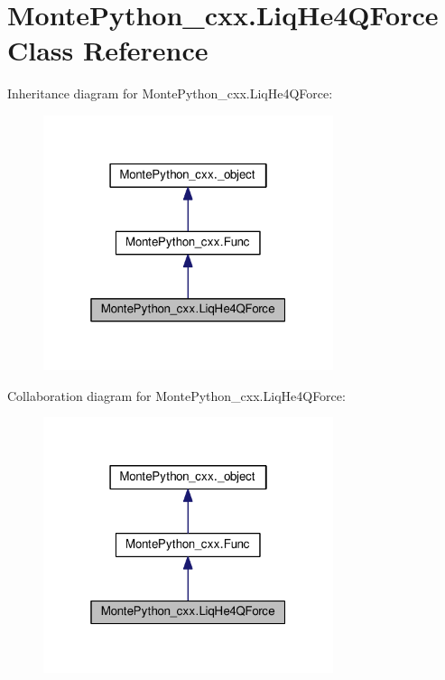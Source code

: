 \hypertarget{classMontePython__cxx_1_1LiqHe4QForce}{}\section{Monte\+Python\+\_\+cxx.\+Liq\+He4\+Q\+Force Class Reference}
\label{classMontePython__cxx_1_1LiqHe4QForce}


Inheritance diagram for Monte\+Python\+\_\+cxx.\+Liq\+He4\+Q\+Force\+:
\nopagebreak
\begin{figure}[H]
\begin{center}
\leavevmode
\includegraphics[width=241pt]{classMontePython__cxx_1_1LiqHe4QForce__inherit__graph}
\end{center}
\end{figure}


Collaboration diagram for Monte\+Python\+\_\+cxx.\+Liq\+He4\+Q\+Force\+:
\nopagebreak
\begin{figure}[H]
\begin{center}
\leavevmode
\includegraphics[width=241pt]{classMontePython__cxx_1_1LiqHe4QForce__coll__graph}
\end{center}
\end{figure}
